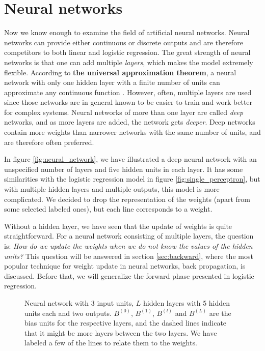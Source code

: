 \section{Neural networks} \label{sec:neural_network}
Now we know enough to examine the field of artificial neural networks. Neural networks can provide either continuous or discrete outputs and are therefore competitors to both linear and logistic regression. The great strength of neural networks is that one can add multiple \textit{layers}, which makes the model extremely flexible. According to \textbf{the universal approximation theorem}, a neural network with only one hidden layer with a finite number of units can approximate any continuous function \supercite{hornik_multilayer_1989}. However, often, multiple layers are used since those networks are in general known to be easier to train and work better for complex systems. Neural networks of more than one layer are called \textit{deep} networks, and as more layers are added, the network gets \textit{deeper}. Deep networks contain more weights than narrower networks with the same number of units, and are therefore often preferred.

In figure \eqref{fig:neural_network}, we have illustrated a deep neural network with an unspecified number of layers and five hidden units in each layer. It has some similarities with the logistic regression model in figure \eqref{fig:single_perceptron}, but with multiple hidden layers and multiple outputs, this model is more complicated. We decided to drop the representation of the weights (apart from some selected labeled ones), but each line corresponds to a weight.

Without a hidden layer, we have seen that the update of weights is quite straightforward. For a neural network consisting of multiple layers, the question is: \textit{How do we update the weights when we do not know the values of the hidden units?} This question will be answered in section \ref{sec:backward}, where the most popular technique for weight update in neural networks, back propagation, is discussed. Before that, we will generalize the forward phase presented in logistic regression.

\begin{figure}
	\centering
	
	\caption{Neural network with 3 input units, $L$ hidden layers with 5 hidden units each and two outputs. $B^{(0)}$, $B^{(1)}$, $B^{(l)}$ and $B^{(L)}$ are the bias units for the respective layers, and the dashed lines indicate that it might be more layers between the two layers. We have labeled a few of the lines to relate them to the weights.}
	\label{fig:neural_network}
\end{figure}

